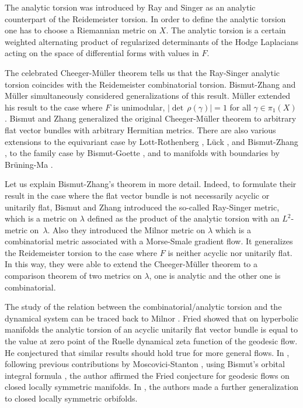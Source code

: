 \documentclass[JEP,XML,SOM,Unicode]{cedram}
\theoremstyle{plain}
\theoremstyle{definition}
\theoremstyle{remark}
\begin{document}
The analytic torsion was introduced by Ray and Singer
\cite{RSTorsion} as an analytic counterpart of the Reidemeister torsion.
In order to define the analytic torsion one has to choose a
Riemannian metric on $X$. The analytic torsion is a certain
weighted alternating product of regularized determinants of the Hodge
Laplacians acting on the space of differential forms with values in
$F$.

The celebrated Cheeger-Müller theorem
\cite{Ch79,Muller78} tells us that the Ray-Singer analytic torsion
coincides with the Reidemeister combinatorial torsion. Bismut-Zhang \cite{BZ92} and Müller \cite{Muller2} simultaneously
considered generalizations of this result.
Müller \cite{Muller2} extended his result to the case where $F$ is
unimodular, \ie $|{\det\,}
\rho(\gamma)|=1$ for all $\gamma\in \pi_{1}(X)$. Bismut and Zhang \cite[Th.\,0.2]{BZ92} generalized the original Cheeger-Müller
theorem to arbitrary flat vector bundles with arbitrary Hermitian
metrics.
There are also various extensions to the
equivariant case by Lott-Rothenberg \cite{LottRothengerg}, Lück \cite{LuckTorsion}, and Bismut-Zhang \cite{BZ94}, to the family case by
Bismut-Goette \cite{BG01}, and to
manifolds with boundaries by Brüning-Ma \cite{BruningMa_2012}.

Let us explain Bismut-Zhang's theorem \cite[Th.\,0.2]{BZ92} in more detail. Indeed, to
formulate their result in the case where the flat vector bundle is not
necessarily acyclic or unitarily flat, Bismut and Zhang introduced the so-called Ray-Singer metric, which is a
metric on $\lambda$ defined as the product of
the analytic torsion with an $L^2$-metric on~$\lambda$.
Also they introduced the Milnor metric on $\lambda$ which is a combinatorial
metric associated with a Morse-Smale gradient flow. It generalizes the
Reidemeister torsion to the case where $F$ is neither acyclic
nor unitarily flat. In this way,
they were able to extend the Cheeger-Müller theorem to a comparison theorem of two metrics on $\lambda$, one is analytic and the other
one is combinatorial.

The study of the relation between the combinatorial/analytic torsion and the dyna\-mical system
can be traced back to Milnor \cite{MilnorZcover}. Fried
\cite{FriedRealtorsion} showed that on hyperbolic manifolds the analytic torsion of an acyclic unitarily flat vector
bundle is equal to the value at zero point of the Ruelle dynamical zeta
function of the geodesic flow. He conjectured
\cite[p.\,66~Conj.]{Friedconj} that similar results should hold true for more general
flows. In \cite{Shfried}, following previous contributions
by
Moscovici-Stanton \cite{MStorsion}, using Bismut's orbital integral formula
\cite{B09}, the author affirmed the Fried
conjecture for geodesic flows on closed locally symmetric
manifolds. In \cite{Shen_Yu}, the authors made a further
generalization to closed locally symmetric orbifolds.
\end{document}
